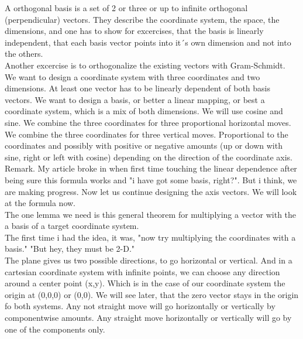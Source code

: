\documentclass[a4paper]{article}
\begin{document}
A orthogonal basis is a set of 2 or three or up to infinite orthogonal (perpendicular) vectors. They describe the coordinate system, the space, the dimensions, and one has to show for excercises, that the basis is linearly independent, that each basis vector points into it´s own dimension and not into the others. \\

Another excercise is to orthogonalize the existing vectors with Gram-Schmidt. \\

We want to design a coordinate system with three coordinates and two dimensions. At least one vector has to be linearly dependent of both basis vectors. We want to design a basis, or better a linear mapping, or best a coordinate system, which is a mix of both dimensions. We will use cosine and sine. We combine the three coordinates for three proportional horizontal moves. We combine the three coordinates for three vertical moves. Proportional to the coordinates and possibly with positive or negative amounts (up or down with sine, right or left with cosine) depending on the direction of the coordinate axis.\\

Remark. My article broke in when first time touching the linear dependence after being sure this formula works and "i have got some basis, right?". But i think, we are making progress. Now let us continue designing the axis vectors. We will look at the formula now.\\

The one lemma we need is this general theorem for multiplying a vector with the a basis of a target coordinate system.\\

The first time i had the idea, it was, "now try multiplying the coordinates with a basis." "But hey, they must be 2-D."\\

The plane gives us two possible directions, to go horizontal or vertical. And in a cartesian coordinate system with infinite points, we can choose any direction around a center point (x,y). Which is in the case of our coordinate system the origin at (0,0,0) or (0,0). We will see later, that the zero vector stays in the origin fo both systems.
Any not straight move will go horizontally or vertically by componentwise amounts. Any straight move horizontally or vertically will go by one of the components only.\\
\end{document}
